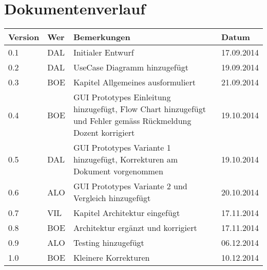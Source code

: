 \newpage
\section*{Dokumentenverlauf}
\begin{center}
	\begin{tabular}{  llp{9cm}l }
		\textbf{Version} & \textbf{Wer} & \textbf{Bemerkungen} & \textbf{Datum} \\\hline
		0.1 & DAL & Initialer Entwurf & 17.09.2014 \\
		0.2 & DAL & UseCase Diagramm hinzugefügt & 19.09.2014 \\
		0.3 & BOE & Kapitel Allgemeines ausformuliert & 21.09.2014 \\
		0.4 & BOE & GUI Prototypes Einleitung hinzugefügt, Flow Chart hinzugefügt und Fehler gemäss Rückmeldung Dozent korrigiert & 19.10.2014 \\
		0.5 & DAL & GUI Prototypes Variante 1 hinzugefügt, Korrekturen am Dokument vorgenommen & 19.10.2014 \\
		0.6 & ALO & GUI Prototypes Variante 2 und Vergleich hinzugefügt & 20.10.2014 \\
		0.7 & VIL & Kapitel Architektur eingefügt & 17.11.2014 \\
		0.8 & BOE & Architektur ergänzt und korrigiert & 17.11.2014 \\
		0.9 & ALO & Testing hinzugefügt & 06.12.2014 \\
		1.0 & BOE & Kleinere Korrekturen & 10.12.2014 \\
	\end{tabular}
\end{center}
\newpage